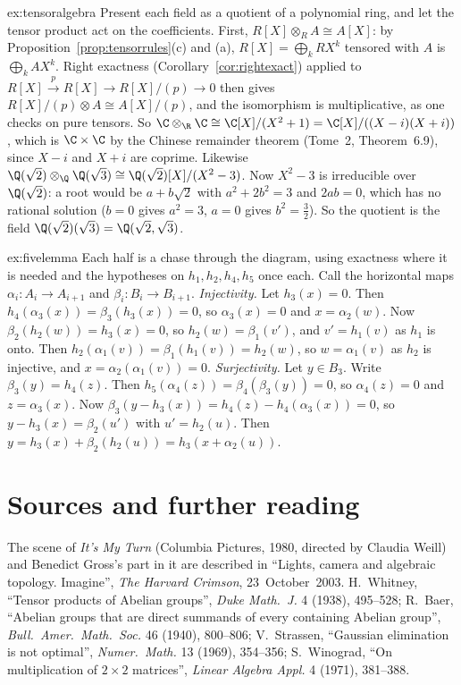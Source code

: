 \begin{solution}{ex:tensoralgebra}
\idea Present each field as a quotient of a polynomial ring, and let the tensor product act on the coefficients.
\writeup First, $R[X]\otimes_RA\cong A[X]$: by Proposition~\ref{prop:tensorrules}(c) and (a), $R[X]=\bigoplus_kRX^k$ tensored with $A$ is $\bigoplus_kAX^k$. Right exactness (Corollary~\ref{cor:rightexact}) applied to
$R[X]\xrightarrow{p}R[X]\to R[X]/(p)\to0$ then gives $R[X]/(p)\otimes A\cong A[X]/(p)$, and the isomorphism is multiplicative, as one checks on pure tensors. So $\C\otimes_{\R}\C\cong\C[X]/(X^2+1)=\C[X]/((X-i)(X+i))$, which is
$\C\times\C$ by the Chinese remainder theorem (Tome~2, Theorem~6.9), since $X-i$ and $X+i$ are coprime. Likewise $\Q(\sqrt2)\otimes_{\Q}\Q(\sqrt3)\cong\Q(\sqrt2)[X]/(X^2-3)$. Now $X^2-3$ is irreducible over $\Q(\sqrt2)$: a root would be
$a+b\sqrt2$ with $a^2+2b^2=3$ and $2ab=0$, which has no rational solution ($b=0$ gives $a^2=3$, $a=0$ gives $b^2=\frac32$). So the quotient is the field $\Q(\sqrt2)(\sqrt3)=\Q(\sqrt2,\sqrt3)$.
\end{solution}

\begin{solution}{ex:fivelemma}
\idea Each half is a chase through the diagram, using exactness where it is needed and the hypotheses on $h_1,h_2,h_4,h_5$ once each.
\writeup Call the horizontal maps $\alpha_i\colon A_i\to A_{i+1}$ and $\beta_i\colon B_i\to B_{i+1}$.
\emph{Injectivity.} Let $h_3(x)=0$. Then $h_4(\alpha_3(x))=\beta_3(h_3(x))=0$, so $\alpha_3(x)=0$ and $x=\alpha_2(w)$. Now $\beta_2(h_2(w))=h_3(x)=0$, so $h_2(w)=\beta_1(v')$, and $v'=h_1(v)$ as $h_1$ is onto. Then $h_2(\alpha_1(v))=\beta_1(h_1(v))=h_2(w)$, so
$w=\alpha_1(v)$ as $h_2$ is injective, and $x=\alpha_2(\alpha_1(v))=0$.
\emph{Surjectivity.} Let $y\in B_3$. Write $\beta_3(y)=h_4(z)$. Then $h_5(\alpha_4(z))=\beta_4(\beta_3(y))=0$, so $\alpha_4(z)=0$ and $z=\alpha_3(x)$. Now $\beta_3(y-h_3(x))=h_4(z)-h_4(\alpha_3(x))=0$, so $y-h_3(x)=\beta_2(u')$ with $u'=h_2(u)$. Then
$y=h_3(x)+\beta_2(h_2(u))=h_3(x+\alpha_2(u))$.
\end{solution}

\section*{Sources and further reading}

The scene of \emph{It's My Turn} (Columbia Pictures, 1980, directed by Claudia Weill) and Benedict Gross's part in it are described in ``Lights, camera and algebraic topology. Imagine'', \emph{The Harvard Crimson}, 23~October~2003.
H.~Whitney, ``Tensor products of Abelian groups'', \emph{Duke Math.\ J.} 4 (1938), 495--528; R.~Baer, ``Abelian groups that are direct summands of every containing Abelian group'', \emph{Bull.\ Amer.\ Math.\ Soc.} 46 (1940),
800--806; V.~Strassen, ``Gaussian elimination is not optimal'', \emph{Numer.\ Math.} 13 (1969), 354--356; S.~Winograd, ``On multiplication of $2\times2$ matrices'', \emph{Linear Algebra Appl.} 4 (1971), 381--388.


